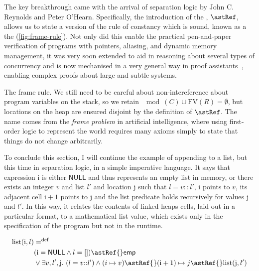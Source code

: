 The key breakthrough came with the arrival of separation logic by John C\@.
Reynolds and Peter O'Hearn. Specifically, the
introduction of the , $\astRef$, allows us to
state a version of the rule of constancy which is sound, known as a the
 (\cref{fig:frame-rule}). Not only did this enable the
practical pen-and-paper verification of programs with pointers, aliasing, and
dynamic memory management, it was very soon extended to aid in reasoning about
several types of concurrency and is now mechanised in a very general way in
proof assistants~\cite{jung2018iris, appel2011verified}, enabling complex
proofs about large and subtle systems.

\begin{marginfigure}
  \begin{mathpar}
  \end{mathpar}
  \caption{The frame rule. We still need to be careful about non-intereference
      about program variables on the stack, so we retain $\mod{(C)} \cup{} \mathrm{FV}(R) = \emptyset{}$,
      but locations on the heap are ensured disjoint by the definition of $\astRef$.
      The name comes from the \emph{frame problem} in artificial intelligence, where
      using first-order logic to represent the world requires many axioms simply to state
      that things do not change arbitrarily.}\label{fig:frame-rule}
\end{marginfigure}

To conclude this section, I will continue the example of appending to a list,
but this time in separation logic, in a simple imperative language. It says
that expression $\mathrm{i}$ is either $\mathsf{NULL}$ and thus represents an
empty list in memory, or there exists an integer $v$ and list $l'$ and location
$\mathrm{j}$ such that $l = v {:}{:} l'$, $\mathrm{i}$ points to $v$, its
adjacent cell $\mathrm{i}+1$ points to $\mathrm{j}$ and the list predicate
holds recursively for values $\mathrm{j}$ and $l'$. In this way, it relates the
contents of linked heaps cells, laid out in a particular format, to a
mathematical list  value, which exists only in the specification
of the program but not in the runtime.

\begin{align*}
    \mathrm{list}(\mathrm{i}, l) &\mathrel{{=}^\mathrm{def}} \\
                                 &(\mathrm{i} = \mathsf{NULL} \wedge{} l = []) \astRef{} \mathsf{emp} \\
                                 &\vee{} \exists{} v, l', \mathrm{j}.\ (l = v {:}{:} l') \wedge{} (i \mapsto v) \astRef{} (\mathrm{i} + 1) \mapsto{} j \astRef{} \mathrm{list}(\mathrm{j}, l')
\end{align*}

